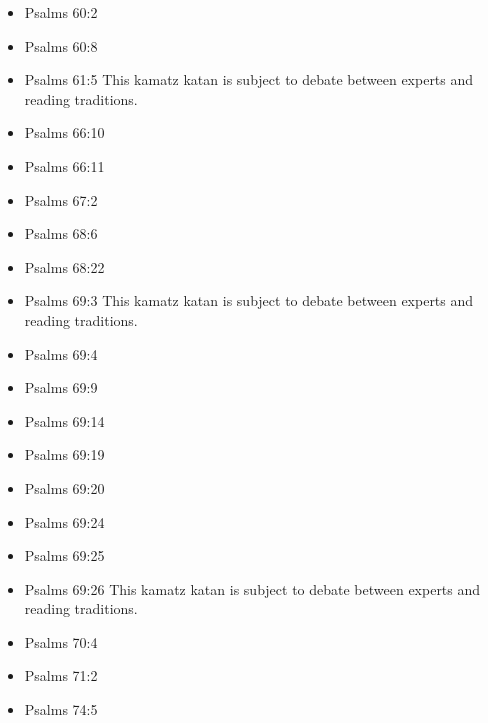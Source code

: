 \documentclass[14pt]{book}
\begin{document}
\begin{multicols}{2}
\begin{itemize}
\item Psalms 60:2

\item Psalms 60:8

\item Psalms 61:5 This kamatz katan is subject to debate between experts and reading traditions.

\item Psalms 66:10

\item Psalms 66:11

\item Psalms 67:2

\item Psalms 68:6

\item Psalms 68:22

\item Psalms 69:3 This kamatz katan is subject to debate between experts and reading traditions.

\item Psalms 69:4
	
	\item Psalms 69:9
	
	\item Psalms 69:14
	
	\item Psalms 69:19
	
	\item Psalms 69:20
	
	\item Psalms 69:24
	
	\item Psalms 69:25
	
	\item Psalms 69:26 This kamatz katan is subject to debate between experts and reading traditions.
	
	\item Psalms 70:4
	
	
	\item Psalms 71:2
	
	\item Psalms 74:5
			

\end{itemize}
\end{multicols}
\end{document}
